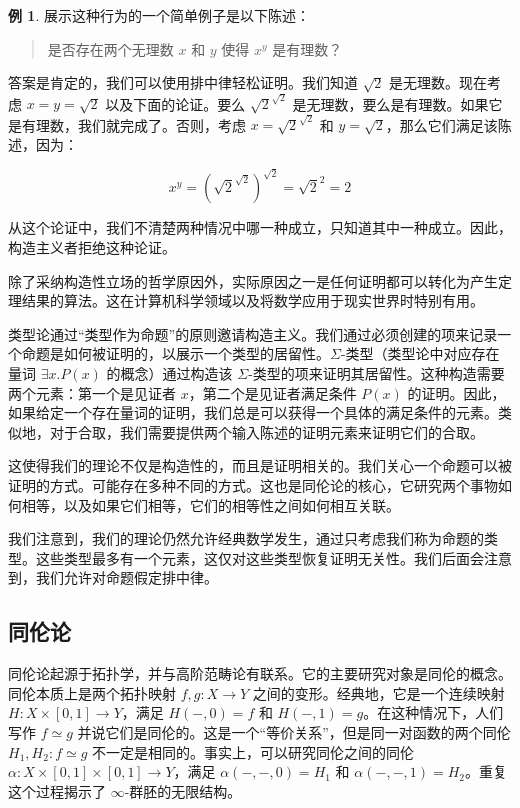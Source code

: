 \documentclass{ctexrep}
\theoremstyle{plain}
\theoremstyle{definition}
\newtheorem{example}[theorem]{例}
\theoremstyle{remark}
\theoremstyle{definition}
\theoremstyle{definition}
\theoremstyle{definition}
\begin{document}
\begin{example}
展示这种行为的一个简单例子是以下陈述：
\begin{quotation}
是否存在两个无理数 $x$ 和 $y$ 使得 $x^{y}$ 是有理数？
\end{quotation}
答案是肯定的，我们可以使用排中律轻松证明。我们知道 $\sqrt{2}$ 是无理数。现在考虑 $x = y = \sqrt{2}$ 以及下面的论证。要么 $\sqrt{2}^{\sqrt{2}}$ 是无理数，要么是有理数。如果它是有理数，我们就完成了。否则，考虑 $x = \sqrt{2}^{\sqrt{2}}$ 和 $y = \sqrt{2}$，那么它们满足该陈述，因为：

\[
x^{y} = \left(\sqrt{2}^{\sqrt{2}}\right)^{\sqrt{2}} = \sqrt{2}^{2} = 2
\]

从这个论证中，我们不清楚两种情况中哪一种成立，只知道其中一种成立。因此，构造主义者拒绝这种论证。
\end{example}

除了采纳构造性立场的哲学原因外，实际原因之一是任何证明都可以转化为产生定理结果的算法。这在计算机科学领域以及将数学应用于现实世界时特别有用。

类型论通过“类型作为命题”的原则邀请构造主义。我们通过必须创建的项来记录一个命题是如何被证明的，以展示一个类型的居留性。$\Sigma$-类型（类型论中对应存在量词 $\exists x.P(x)$ 的概念）通过构造该 $\Sigma$-类型的项来证明其居留性。这种构造需要两个元素：第一个是见证者 $x$，第二个是见证者满足条件 $P(x)$ 的证明。因此，如果给定一个存在量词的证明，我们总是可以获得一个具体的满足条件的元素。类似地，对于合取，我们需要提供两个输入陈述的证明元素来证明它们的合取。

这使得我们的理论不仅是构造性的，而且是证明相关的。我们关心一个命题可以被证明的方式。可能存在多种不同的方式。这也是同伦论的核心，它研究两个事物如何相等，以及如果它们相等，它们的相等性之间如何相互关联。

我们注意到，我们的理论仍然允许经典数学发生，通过只考虑我们称为命题的类型。这些类型最多有一个元素，这仅对这些类型恢复证明无关性。我们后面会注意到，我们允许对命题假定排中律。

\subsection{同伦论}

同伦论起源于拓扑学，并与高阶范畴论有联系。它的主要研究对象是同伦的概念。同伦本质上是两个拓扑映射 $f,g:X\to Y$ 之间的变形。经典地，它是一个连续映射 $H:X\times [0,1]\to Y$，满足 $H(- ,0) = f$ 和 $H(- ,1) = g$。在这种情况下，人们写作 $f\simeq g$ 并说它们是同伦的。这是一个“等价关系”，但是同一对函数的两个同伦 $H_{1},H_{2}:f\simeq g$ 不一定是相同的。事实上，可以研究同伦之间的同伦 $\alpha :X\times [0,1]\times [0,1]\to Y$，满足 $\alpha (- , - ,0) = H_{1}$ 和 $\alpha (- , - ,1) = H_{2}$。重复这个过程揭示了 $\infty$-群胚的无限结构。
\end{document}
